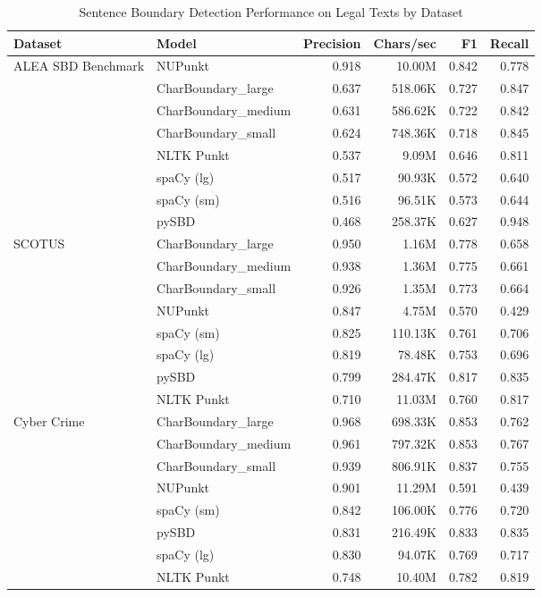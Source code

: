 \begin{table*}[htbp!]
\centering
\caption{Sentence Boundary Detection Performance on Legal Texts by Dataset}
\label{tab:sbd-precision-performance}
\begin{tabular}{llrrrr}
\toprule
Dataset & Model & \textbf{Precision} & Chars/sec & F1 & Recall \\
\midrule
ALEA SBD Benchmark & NUPunkt & 0.918 & 10.00M & 0.842 & 0.778 \\
 & CharBoundary_large & 0.637 & 518.06K & 0.727 & 0.847 \\
 & CharBoundary_medium & 0.631 & 586.62K & 0.722 & 0.842 \\
 & CharBoundary_small & 0.624 & 748.36K & 0.718 & 0.845 \\
 & NLTK Punkt & 0.537 & 9.09M & 0.646 & 0.811 \\
 & spaCy (lg) & 0.517 & 90.93K & 0.572 & 0.640 \\
 & spaCy (sm) & 0.516 & 96.51K & 0.573 & 0.644 \\
 & pySBD & 0.468 & 258.37K & 0.627 & 0.948 \\
\midrule
SCOTUS & CharBoundary_large & 0.950 & 1.16M & 0.778 & 0.658 \\
 & CharBoundary_medium & 0.938 & 1.36M & 0.775 & 0.661 \\
 & CharBoundary_small & 0.926 & 1.35M & 0.773 & 0.664 \\
 & NUPunkt & 0.847 & 4.75M & 0.570 & 0.429 \\
 & spaCy (sm) & 0.825 & 110.13K & 0.761 & 0.706 \\
 & spaCy (lg) & 0.819 & 78.48K & 0.753 & 0.696 \\
 & pySBD & 0.799 & 284.47K & 0.817 & 0.835 \\
 & NLTK Punkt & 0.710 & 11.03M & 0.760 & 0.817 \\
\midrule
Cyber Crime & CharBoundary_large & 0.968 & 698.33K & 0.853 & 0.762 \\
 & CharBoundary_medium & 0.961 & 797.32K & 0.853 & 0.767 \\
 & CharBoundary_small & 0.939 & 806.91K & 0.837 & 0.755 \\
 & NUPunkt & 0.901 & 11.29M & 0.591 & 0.439 \\
 & spaCy (sm) & 0.842 & 106.00K & 0.776 & 0.720 \\
 & pySBD & 0.831 & 216.49K & 0.833 & 0.835 \\
 & spaCy (lg) & 0.830 & 94.07K & 0.769 & 0.717 \\
 & NLTK Punkt & 0.748 & 10.40M & 0.782 & 0.819 \\

\end{tabular}
\end{table*}
